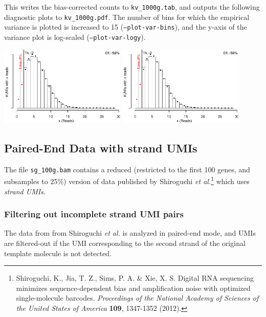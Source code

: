\documentclass[10pt]{article}
\begin{document}

This writes the bias-corrected counts to \texttt{kv\_1000g.tab}, and outputs the following diagnostic plots to \texttt{kv\_1000g.pdf}. The number of bins for which the empirical variance is plotted is increased to 15 (\texttt{--plot-var-bins}), and the y-axis of the variance plot is log-scaled (\texttt{--plot-var-logy}).

{\centering \includegraphics[width=6cm,page=1]{../examples/kv_1000g.pdf}
            \includegraphics[width=6cm,page=2]{../examples/kv_1000g.pdf}\\}

\subsection{Paired-End Data with strand UMIs}

The file \texttt{sg\_100g.bam} contains a reduced (restricted to the first 100 genes, and subsamples to 25\%) version of data published by Shiroguchi \textit{et al.}\footnote{Shiroguchi, K., Jia, T. Z., Sims, P. A. \& Xie, X. S. Digital RNA sequencing minimizes sequence-dependent bias and amplification noise with optimized single-molecule barcodes. \textit{Proceedings of the National Academy of Sciences of the United States of America} \textbf{109}, 1347-1352 (2012).} which uses \emph{strand UMIs}.

\subsubsection*{Filtering out incomplete strand UMI pairs}

The data from from Shiroguchi \textit{et al.} is analyzed in paired-end mode, and UMIs are filtered-out if the UMI corresponding to the second strand of the original template molecule is not detected.
\end{document}
